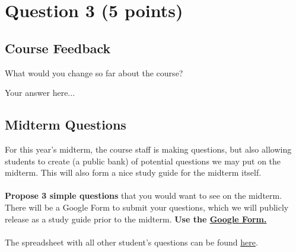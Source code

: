 \documentclass[12pt]{article}
\begin{document}
\section*{Question 3 (5 points)}
\subsection*{Course Feedback}
What would you change so far about the course?

\begin{solution}
Your answer here...
\end{solution}

\subsection*{Midterm Questions}
For this year's midterm, the course staff is making questions, but also allowing students to create (a public bank) of potential questions we may put on the midterm. This will also form a nice study guide for the midterm itself.
\\\\
\textbf{Propose 3 simple questions} that you would want to see on the midterm. There will be a Google Form to submit your questions, which we will publicly release as a study guide prior to the midterm. \textbf{Use the \href{https://forms.gle/9Zqc9jFWd1SfdbrA9}{Google Form.}}
\\\\
The spreadsheet with all other student's questions can be found \href{https://docs.google.com/spreadsheets/d/1tT2kpBZB2Ab947VrmPoJ8w-VXta68E7jwSp7Z-rO3RE/edit}{here}.
\end{document}
